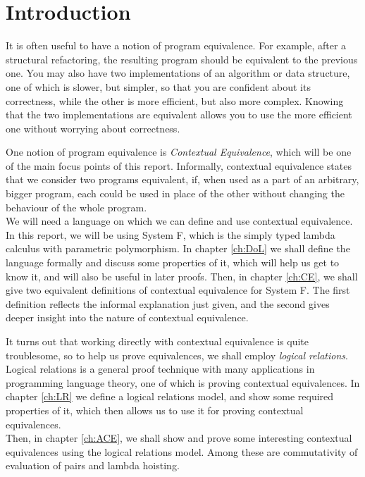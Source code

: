 \documentclass[a4paper, 11pt]{report}
\theoremstyle{definition}
\begin{document}
\tableofcontents
\cleardoublepage
{}
\setcounter{secnumdepth}{2}


\chapter{Introduction}
\label{ch:intro}

It is often useful to have a notion of program equivalence. For example, after a structural refactoring, the resulting program should be equivalent to the previous one. You may also have two implementations of an algorithm or data structure, one of which is slower, but simpler, so that you are confident about its correctness, while the other is more efficient, but also more complex. Knowing that the two implementations are equivalent allows you to use the more efficient one without worrying about correctness.

One notion of program equivalence is \textit{Contextual Equivalence}, which will be one of the main focus points of this report. Informally, contextual equivalence states that we consider two programs equivalent, if, when used as a part of an arbitrary, bigger program, each could be used in place of the other without changing the behaviour of the whole program.\\
We will need a language on which we can define and use contextual equivalence.
In this report, we will be using System F, which is the simply typed lambda calculus with parametric polymorphism. In chapter \ref{ch:DoL} we shall define the language formally and discuss some properties of it, which will help us get to know it, and will also be useful in later proofs. Then, in chapter \ref{ch:CE}, we shall give two equivalent definitions of contextual equivalence for System F. The first definition reflects the informal explanation just given, and the second gives deeper insight into the nature of contextual equivalence.

It turns out that working directly with contextual equivalence is quite troublesome, so to help us prove equivalences, we shall employ \textit{logical relations}. Logical relations is a general proof technique with many applications in programming language theory, one of which is proving contextual equivalences. In chapter \ref{ch:LR} we define a logical relations model, and show some required properties of it, which then allows us to use it for proving contextual equivalences.\\
Then, in chapter \ref{ch:ACE}, we shall show and prove some interesting contextual equivalences using the logical relations model. Among these are commutativity of evaluation of pairs and lambda hoisting.
\end{document}
